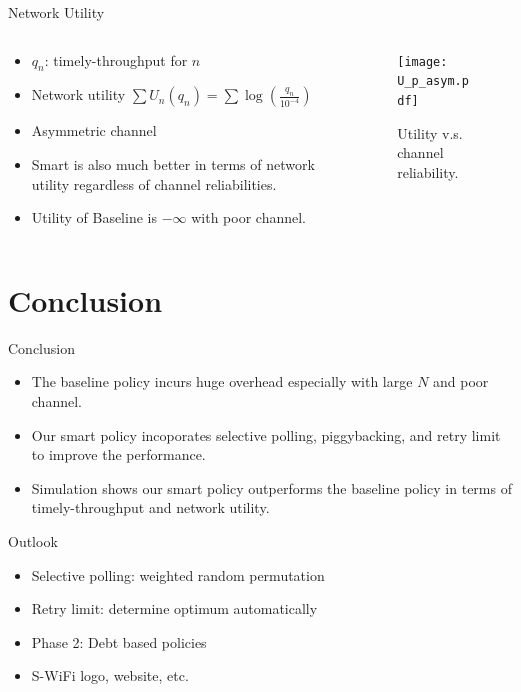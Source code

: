 \documentclass{beamer}
\begin{document}
\begin{frame}{Network Utility}
\begin{columns}
  \begin{column}{.5\textwidth}
  \begin{itemize}
    \item $q_n$: timely-throughput for $n$
    \item Network utility $\sum U_n(q_n) = \sum \log (\frac{q_n}{10^{-4}})$
    \item Asymmetric channel
    \item Smart is also much better in terms of network utility
      regardless of channel reliabilities.
    \item Utility of Baseline is $-\infty$ with poor channel.
  \end{itemize}
  \end{column}
  \begin{column}{.5\textwidth}
\begin{figure}[htbp]
  \centering
  \texttt{[image: U\_p\_asym.pdf]}
  \caption{Utility v.s. channel reliability.}
\end{figure}
  \end{column}
\end{columns}
\end{frame}

\section*{Conclusion}
\begin{frame}{Conclusion}
  \begin{itemize}
    \item The baseline policy incurs huge overhead especially with large $N$ and poor channel.
    \item Our smart policy incoporates selective polling, piggybacking, and
      retry limit to improve the performance.
    \item Simulation shows our smart policy outperforms the baseline policy in
      terms of timely-throughput and network utility.
  \end{itemize}
\end{frame}

\begin{frame}{Outlook}
  \begin{itemize}
    \item Selective polling: weighted random permutation
    \item Retry limit: determine optimum automatically
    \item Phase 2: Debt based policies
    \item S-WiFi logo, website, etc.
  \end{itemize}
\end{frame}
\end{document}
